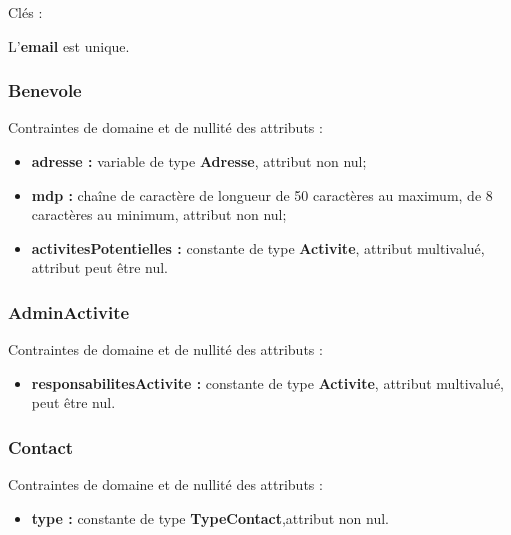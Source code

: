 Clés : 

L'\textbf{email} est unique.\\

\subsubsection*{Benevole}
Contraintes de domaine et de nullité des attributs :
\begin{itemize}
 	\item \textbf{adresse :} variable de type \textbf{Adresse}, attribut non nul;
	\item \textbf{mdp :} chaîne de caractère de longueur de 50 caractères au maximum, de 8 caractères au minimum, attribut non nul;  
	\item \textbf{activitesPotentielles :} constante de type \textbf{Activite}, attribut multivalué, attribut  peut être nul.\\
\end{itemize}  

\subsubsection*{AdminActivite}
Contraintes de domaine et de nullité des attributs :
\begin{itemize}
\item \textbf{responsabilitesActivite :} constante de type \textbf{Activite}, attribut multivalué, peut être nul.\\
\end{itemize}

 
\subsubsection*{Contact}
Contraintes de domaine et de nullité des attributs :
 \begin{itemize}
 \item \textbf{type :} constante de type \textbf{TypeContact},attribut non nul.\\
 \end{itemize}

